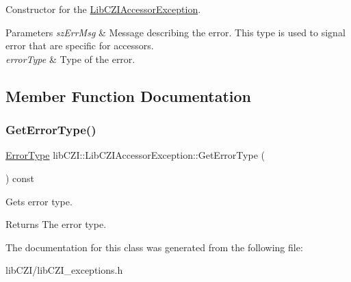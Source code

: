 Constructor for the \hyperlink{classlib_c_z_i_1_1_lib_c_z_i_accessor_exception}{Lib\+C\+Z\+I\+Accessor\+Exception}. 
\begin{DoxyParams}{Parameters}
{\em sz\+Err\+Msg} & Message describing the error. This type is used to signal error that are specific for accessors. \\
\hline
{\em error\+Type} & Type of the error. \\
\hline
\end{DoxyParams}


\subsection{Member Function Documentation}
\mbox{\label{classlib_c_z_i_1_1_lib_c_z_i_accessor_exception_a8d5241a5d61e5d2ae97a6ee4c8f3e39e}} 
\subsubsection{\texorpdfstring{Get\+Error\+Type()}{GetErrorType()}}
{\footnotesize\ttfamily \hyperlink{classlib_c_z_i_1_1_lib_c_z_i_accessor_exception_afac26a03ad8be1d8314911a58b9b08b5}{Error\+Type} lib\+C\+Z\+I\+::\+Lib\+C\+Z\+I\+Accessor\+Exception\+::\+Get\+Error\+Type (\begin{DoxyParamCaption}{ }\end{DoxyParamCaption}) const\hspace{0.3cm}{\ttfamily [inline]}}

Gets error type. \begin{DoxyReturn}{Returns}
The error type. 
\end{DoxyReturn}


The documentation for this class was generated from the following file\+:\begin{DoxyCompactItemize}
\item 
lib\+C\+Z\+I/lib\+C\+Z\+I\+\_\+exceptions.\+h\end{DoxyCompactItemize}
